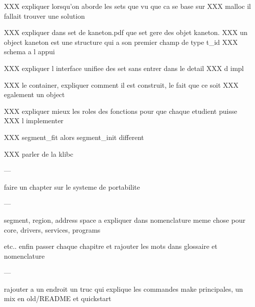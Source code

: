 XXX expliquer lorsqu'on aborde les sets que vu que ca se base sur
XXX malloc il fallait trouver une solution

XXX expliquer dans set de kaneton.pdf que set gere des objet kaneton.
XXX un object kaneton est une structure qui a son premier champ de type t\_id
XXX schema a l appui

XXX expliquer l interface unifiee des set sans entrer dans le detail
XXX d impl

XXX le container, expliquer comment il est construit, le fait que ce soit
XXX egalement un object

XXX expliquer mieux les roles des fonctions pour que chaque etudient puisse
XXX l implementer

XXX segment\_fit alors segment\_init different

XXX parler de la klibc

---

faire un chapter sur le systeme de portabilite

---

segment, region, address space a expliquer dans nomenclature
meme chose pour core, drivers, services, programs

etc.. enfin passer chaque chapitre et rajouter les mots dans glossaire
et nomenclature

---

rajouter a un endroit un truc qui explique les commandes make principales,
un mix en old/README et quickstart
